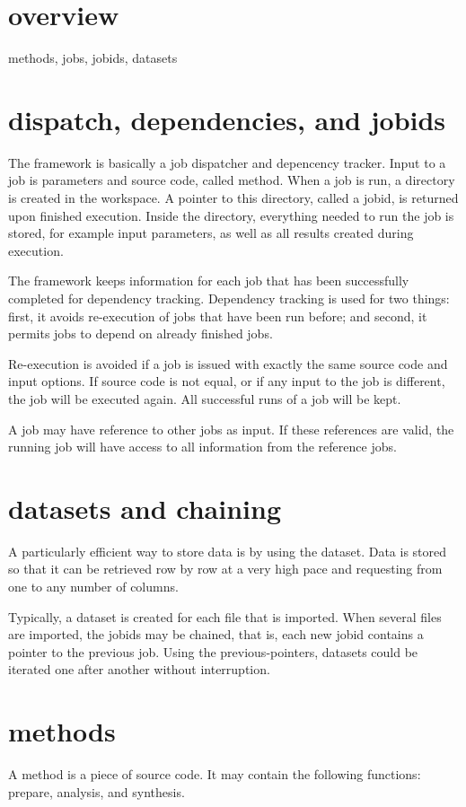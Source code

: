 
\section{overview}

methods, jobs, jobids, datasets


\section{dispatch, dependencies, and jobids}
The framework is basically a job dispatcher and depencency tracker.
Input to a job is parameters and source code, called method.  When a
job is run, a directory is created in the workspace.  A pointer to
this directory, called a jobid, is returned upon finished execution.
Inside the directory, everything needed to run the job is stored, for
example input parameters, as well as all results created during
execution.

The framework keeps information for each job that has been
successfully completed for dependency tracking.  Dependency tracking
is used for two things: first, it avoids re-execution of jobs that
have been run before; and second, it permits jobs to depend on already
finished jobs.

Re-execution is avoided if a job is issued with exactly the same
source code and input options.  If source code is not equal, or if any
input to the job is different, the job will be executed again.  All
successful runs of a job will be kept.

A job may have reference to other jobs as input.  If these references
are valid, the running job will have access to all information from
the reference jobs.

\section{datasets and chaining}
A particularly efficient way to store data is by using the dataset.
Data is stored so that it can be retrieved row by row at a very high
pace and requesting from one to any number of columns.

Typically, a dataset is created for each file that is imported.  When
several files are imported, the jobids may be chained, that is, each
new jobid contains a pointer to the previous job.  Using the
previous-pointers, datasets could be iterated one after another
without interruption.




\section{methods}
A method is a piece of source code.  It may contain the following
functions:  prepare, analysis, and synthesis.

